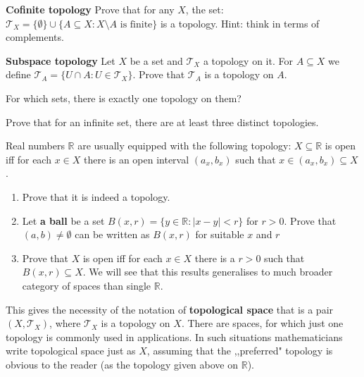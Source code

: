 \begin{prob}
	\textbf{Cofinite topology} Prove that for any $X$, the set:
  $\mathcal T_X=\{\emptyset\}\cup \{A\subseteq X : X\setminus A \text{ is finite}\}$ is a topology. Hint: think in terms of complements.
\end{prob}

\begin{prob}
  \textbf{Subspace topology}
  Let $X$ be a set and $\mathcal T_X$ a topology on it. For $A\subseteq X$ we define $\mathcal T_A=\{U\cap A : U\in \mathcal T_X\}$. Prove that $\mathcal T_A$ is a topology on $A$.
\end{prob}

\begin{prob}
	For which sets, there is exactly one topology on them?
\end{prob}

\begin{prob}
	Prove that for an infinite set, there are at least three distinct
  topologies.
\end{prob}

\begin{prob}
  Real numbers $\mathbb R$ are usually equipped with the following topology:
  $X\subseteq \mathbb R$ is open iff for each $x\in X$ there is an open interval $(a_x,b_x)$ such that
  $x\in (a_x, b_x)\subseteq X$.
  \begin{enumerate}
    \item Prove that it is indeed a topology.
    \item Let \textbf{a ball} be a set $B(x,r) = \{y\in \mathbb R : |x-y| < r\}$ for $r>0$. Prove that $(a,b)\neq \emptyset$ can be written as $B(x,r)$ for suitable $x$ and $r$
    \item Prove that $X$ is open iff for each $x\in X$ there is a $r>0$ such that $B(x,r)\subseteq X$. We will see that this results generalises to much broader category of spaces
      than single $\mathbb R$.
  \end{enumerate}
\end{prob}

\noindent This gives the necessity of the notation of \textbf{topological space} that is a pair $(X,\mathcal T_X)$, where $\mathcal T_X$ is a topology on
$X$. There are spaces, for which just one topology is commonly used in applications. In such situations mathematicians write topological space just as
$X$, assuming that the ,,preferred" topology is obvious to the reader (as the topology given above on $\mathbb R$).


